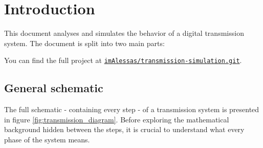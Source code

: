 \setcounter{secnumdepth}{0}
\section{Introduction}
This document analyses and simulates the behavior of a digital transmission system. The document is split into two main parts:


You can find the full project at \texttt{\href{https://github.com/imAlessas/transmission-simulation.git}{imAlessas/transmission-simulation.git}}.

\subsection{General schematic}
The full schematic - containing every step - of a transmission system is presented in figure \ref{fig:transmission_diagram}. Before exploring the mathematical background hidden between the steps, it is crucial to understand what every phase of the system means.

